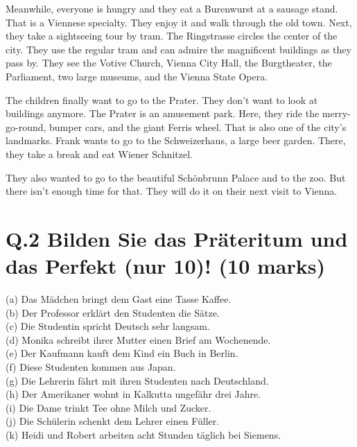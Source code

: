 \documentclass[a4paper,12pt]{article}
\begin{document}
Meanwhile, everyone is hungry and they eat a Burenwurst at a sausage stand. That is a Viennese specialty. They enjoy it and walk through the old town. Next, they take a sightseeing tour by tram. The Ringstrasse circles the center of the city. They use the regular tram and can admire the magnificent buildings as they pass by. They see the Votive Church, Vienna City Hall, the Burgtheater, the Parliament, two large museums, and the Vienna State Opera.

The children finally want to go to the Prater. They don’t want to look at buildings anymore. The Prater is an amusement park. Here, they ride the merry-go-round, bumper cars, and the giant Ferris wheel. That is also one of the city’s landmarks. Frank wants to go to the Schweizerhaus, a large beer garden. There, they take a break and eat Wiener Schnitzel.

They also wanted to go to the beautiful Schönbrunn Palace and to the zoo. But there isn’t enough time for that. They will do it on their next visit to Vienna.




\vspace{1cm}

\section*{Q.2 Bilden Sie das Präteritum und das Perfekt (nur 10)! (10 marks)}

(a) Das Mädchen bringt dem Gast eine Tasse Kaffee.\\
(b) Der Professor erklärt den Studenten die Sätze.\\
(c) Die Studentin spricht Deutsch sehr langsam.\\
(d) Monika schreibt ihrer Mutter einen Brief am Wochenende.\\
(e) Der Kaufmann kauft dem Kind ein Buch in Berlin.\\
(f) Diese Studenten kommen aus Japan.\\
(g) Die Lehrerin fährt mit ihren Studenten nach Deutschland.\\
(h) Der Amerikaner wohnt in Kalkutta ungefähr drei Jahre.\\
(i) Die Dame trinkt Tee ohne Milch und Zucker.\\
(j) Die Schülerin schenkt dem Lehrer einen Füller.\\
(k) Heidi und Robert arbeiten acht Stunden täglich bei Siemens.
\end{document}
